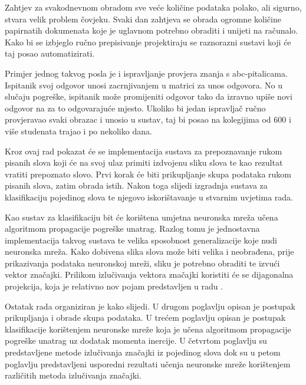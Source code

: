 Zahtjev za svakodnevnom obradom sve veće količine podataka polako, ali sigurno, stvara velik problem čovjeku. Svaki dan zahtjeva se obrada ogromne količine papirnatih dokumenata koje je uglavnom potrebno obraditi i unijeti na računalo. Kako bi se izbjeglo ručno prepisivanje projektiraju se raznorazni sustavi koji će taj posao automatizirati.

Primjer jednog takvog posla je i ispravljanje provjera znanja s abc-pitalicama. Ispitanik svoj odgovor unosi zacrnjivanjem u matrici za unos odgovora. No u slučaju pogreške, ispitanik može promijeniti odgovor tako da izravno upiše novi odgovor na za to odgovarajuće mjesto. Ukoliko bi jedan ispravljač ručno provjeravao svaki obrazac i unosio u sustav, taj bi posao na kolegijima od 600 i više studenata trajao i po nekoliko dana.

Kroz ovaj rad pokazat će se implementacija sustava za prepoznavanje rukom pisanih slova koji će na svoj ulaz primiti izdvojenu sliku slova te kao rezultat vratiti prepoznato slovo. Prvi korak će biti prikupljanje skupa podataka rukom pisanih slova, zatim obrada istih. Nakon toga slijedi izgradnja sustava za klasifikaciju pojedinog slova te njegovo iskorištavanje u stvarnim uvjetima rada.

Kao sustav za klasifikaciju bit će korištena umjetna neuronska mreža učena algoritmom propagacije pogreške unatrag. Razlog tomu je jednostavna implementacija takvog sustava te velika sposobnost generalizacije koje nudi neuronska mreža. Kako dobivena slika slova može biti velika i neobrađena, prije prikazivanja podataka neuronskoj mreži, sliku je potrebno obraditi te izvući vektor značajki. Prilikom izlučivanja vektora značajki koristiti će se dijagonalna projekcija, koja je relativno nov pojam predstavljen u radu \citep{diagonal2011}. 

Ostatak rada organiziran je kako slijedi. U drugom poglavlju opisan je postupak prikupljanja i obrade skupa podataka. U trećem poglavlju opisan je postupak klasifikacije korištenjem neuronske mreže koja je učena algoritmom propagacije pogreške unatrag uz dodatak momenta inercije. U četvrtom poglavlju su predstavljene metode izlučivanja značajki iz pojedinog slova dok su u petom poglavlju predstavljeni usporedni rezultati učenja neuronske mreže korištenjem različitih metoda izlučivanja značajki.